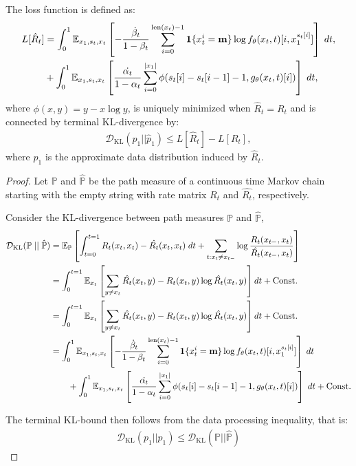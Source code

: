 \begin{appprop} \label{prop:flexmdm-loss-appendix}
The loss function is defined as:
\begin{align}
     L[\hat{R}_t]  &= \int_0^1\mathbb{E}_{x_1, s_t, x_t} \left[
-\frac{\dot{\beta}_t}{1 - \beta_t} \sum_{i=0}^{\mathrm{len}(x_t)-1} \mathbf{1}\{x_t^i = \mathbf{m}\} \log f_\theta(x_t, t)[i, x_1^{s_t[i]}] \right] \; dt, \\ 
&+   \int_0^1\mathbb{E}_{x_1, s_t, x_t} \left[\frac{\dot{\alpha_t}}{1-\alpha_t}\sum_{i=0}^{|x_1|} \phi(s_t[i] - s_t[i-1] - 1, g_\theta(x_t, t)[i])\right] \; dt,
\end{align}
where $\phi(x, y) = y - x \log {y}$, is uniquely minimized when $\hat{R}_t = R_t$ and is connected by terminal KL-divergence by:
\begin{align}
    \mathcal{D}_\text{KL}(p_1 || \hat{p}_1) \leq L[\hat{R}_t] - L[R_t],
\end{align}
where $\hat{p}_1$ is the approximate data distribution induced by $\hat{R}_t$.
\end{appprop}
\begin{proof}
Let $\mathbb{P}$ and $\mathbb{\hat{P}}$ be the path measure of a continuous time Markov chain starting with the empty string with rate matrix $R_t$ and $\hat{R_t}$, respectively.

Consider the KL-divergence between path measures $\mathbb P$ and $\mathbb{\hat{P}}$,
\begin{align*}
\mathcal{D}_\text{KL}(\mathbb P \mid\mid \mathbb{\hat{P}})  &= \mathbb{E}_{\mathbb{P}} \left[\int_{t=0}^{t=1} R_t(x_t, x_t) - \hat{R_t}(x_t, x_t) \; dt +  \sum_{t : x_t \neq x_{t-}} \log \frac{R_t(x_{t-}, x_t)}{\hat{R_t}(x_{t-}, x_t)}\right] \\ 
&= \int_0^{t=1} \mathbb{E}_{x_t} \left[\sum_{y \neq x_t}\hat{R_t}(x_t, y) - R_t(x_t, y) \log \hat{R_t}(x_t, y)\right] dt+ \text{Const.} \\ 
&=  \int_0^{t=1} \mathbb{E}_{x_t} \left[\sum_{y \neq x_t}\hat{R_t}(x_t, y) - R_t(x_t, y) \log \hat{R_t}(x_t, y)\right] dt+ \text{Const.} \\ 
&= \int_0^1\mathbb{E}_{x_1, s_t, x_t} \left[
-\frac{\dot{\beta}_t}{1 - \beta_t} \sum_{i=0}^{\mathrm{len}(x_t)-1} \mathbf{1}\{x_t^i = \mathbf{m}\} \log f_\theta(x_t, t)[i, x_1^{s_t[i]}] \right] \; dt \\ 
&\quad\quad+ \int_0^1\mathbb{E}_{x_1, s_t, x_t} \left[\frac{\dot{\alpha_t}}{1-\alpha_t}\sum_{i=0}^{|x_1|} \phi(s_t[i] - s_t[i-1] - 1, g_\theta(x_t, t)[i])\right] \; dt + \text{Const.}
\end{align*}


The terminal KL-bound then follows from the data processing inequality, that is:
\begin{align*}
    \mathcal{D}_\text{KL}(p_1||\hat{p}_1) \leq \mathcal{D}_\text{KL}(\mathbb{P} || \mathbb{\hat{P}})
\end{align*}
\end{proof}